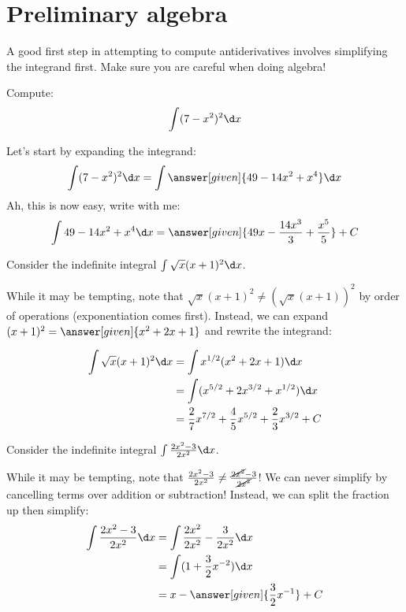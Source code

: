 \documentclass[nooutcomes]{ximera}
\begin{document}
 
 
\section{Preliminary algebra}

A good first step in attempting to compute antiderivatives involves simplifying the integrand first.  Make sure you are careful when doing algebra!


\begin{example}
  Compute:
  \[
  \int (7-x^2)^2 \d x
  \]
  \begin{explanation}
    Let's start by expanding the integrand:
    \[
    \int (7-x^2)^2 \d x  = \int \answer[given]{49 - 14x^2 + x^4} \d x
    \]
    Ah, this is now easy, write with me:
    \[
    \int 49 - 14x^2 + x^4 \d x = \answer[given]{49x - \frac{14 x^3}{3} + \frac{x^5}{5}} + C
    \]
  \end{explanation}
\end{example}

\begin{example}
Consider the indefinite integral $\int \sqrt{x}(x+1)^2 \d x$.  

While it may be tempting, note that $\sqrt{x}(x+1)^2 \neq (\sqrt{x}(x+1))^2$ by order of operations (exponentiation comes first). Instead, we can expand $(x+1)^2 = \answer[given]{x^2+2x+1}$ and rewrite the integrand:

\begin{align*}
\int \sqrt{x}(x+1)^2 \d x &= \int x^{1/2} (x^2+2x+1) \d x \\
&=  \int (x^{5/2}+2x^{3/2}+x^{1/2}) \d x \\
&= \frac{2}{7} x^{7/2}+\frac{4}{5}x^{5/2}+\frac{2}{3}x^{3/2}+C
\end{align*}

\end{example}
 
\begin{example}
Consider the indefinite integral $\int \frac{2x^2-3}{2x^2} \d x$.  

While it may be tempting, note that $\frac{2x^2-3}{2x^2} \neq \frac{\cancel{2x^2}-3}{\cancel{2x^2}}$!  We can never simplify by cancelling terms over addition or subtraction!  Instead, we can split the fraction up then simplify: 
\begin{align*}
\int \frac{2x^2-3}{2x^2} \d x &=\int \frac{2x^2}{2x^2}-\frac{3}{2x^2} \d x \\
&=  \int (1+\frac{3}{2}x^{-2}) \d x \\
&= x- \answer[given]{\frac{3}{2}x^{-1}}+C
\end{align*}

\end{example}
\end{document}
